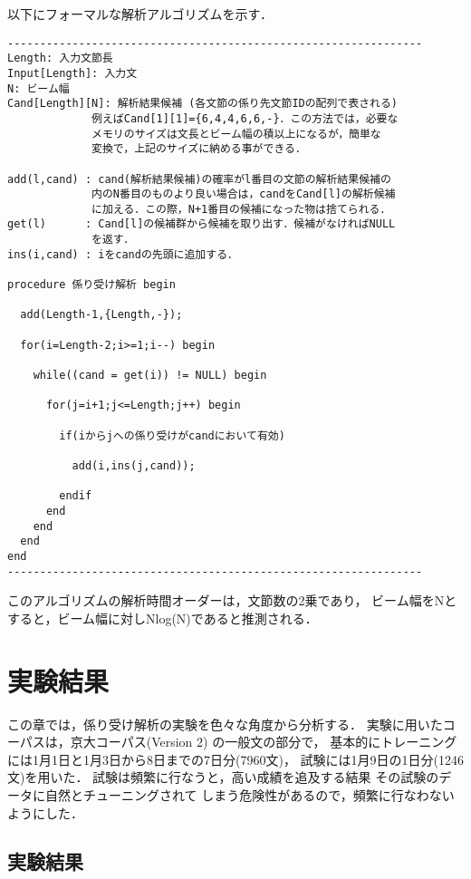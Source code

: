 以下にフォーマルな解析アルゴリズムを示す．
\begin{verbatim}
----------------------------------------------------------------
Length: 入力文節長
Input[Length]: 入力文
N: ビーム幅
Cand[Length][N]: 解析結果候補 (各文節の係り先文節IDの配列で表される)
             例えばCand[1][1]={6,4,4,6,6,-}．この方法では，必要な
             メモリのサイズは文長とビーム幅の積以上になるが，簡単な
             変換で，上記のサイズに納める事ができる．

add(l,cand) : cand(解析結果候補)の確率がl番目の文節の解析結果候補の
             内のN番目のものより良い場合は，candをCand[l]の解析候補
             に加える．この際，N+1番目の候補になった物は捨てられる．
get(l)      : Cand[l]の候補群から候補を取り出す．候補がなければNULL
             を返す．
ins(i,cand) : iをcandの先頭に追加する．

procedure 係り受け解析 begin

  add(Length-1,{Length,-});

  for(i=Length-2;i>=1;i--) begin

    while((cand = get(i)) != NULL) begin

      for(j=i+1;j<=Length;j++) begin

        if(iからjへの係り受けがcandにおいて有効)

          add(i,ins(j,cand));

        endif
      end
    end
  end
end
----------------------------------------------------------------
\end{verbatim}
このアルゴリズムの解析時間オーダーは，文節数の2乗であり，
ビーム幅をNとすると，ビーム幅に対しNlog(N)であると推測される．

\section{実験結果}

この章では，係り受け解析の実験を色々な角度から分析する．
実験に用いたコーパスは，京大コーパス(Version 2)
\cite{kurohashi:nlp97} の一般文の部分で，
基本的にトレーニングには1月1日と1月3日から8日までの7日分(7960文)，
試験には1月9日の1日分(\mbox{1246}文)を用いた．
試験は頻繁に行なうと，高い成績を追及する結果
その試験のデータに自然とチューニングされて
しまう危険性があるので，頻繁に行なわないようにした．

\subsection{実験結果}

